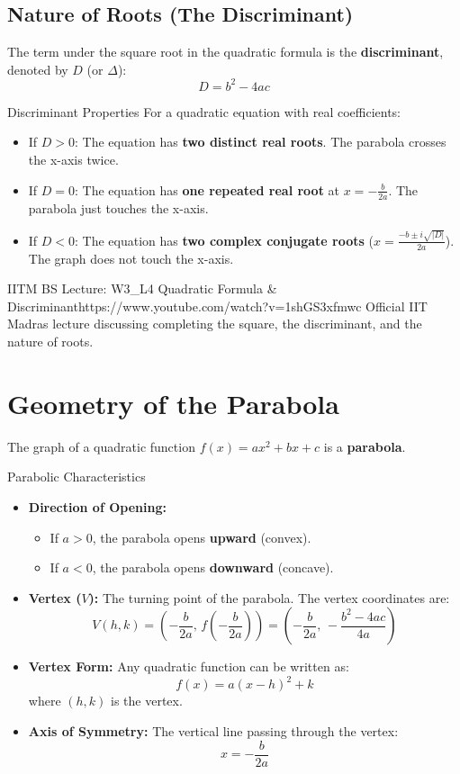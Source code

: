 \subsection{Nature of Roots (The Discriminant)}

The term under the square root in the quadratic formula is the \textbf{discriminant}, denoted by $D$ (or $\Delta$):
$$D = b^2 - 4ac$$

\begin{theorembox}{Discriminant Properties}
For a quadratic equation with real coefficients:
\begin{itemize}
    \item If $D > 0$: The equation has \textbf{two distinct real roots}. The parabola crosses the x-axis twice.
    \item If $D = 0$: The equation has \textbf{one repeated real root} at $x = -\frac{b}{2a}$. The parabola just touches the x-axis.
    \item If $D < 0$: The equation has \textbf{two complex conjugate roots} ($x = \frac{-b \pm i\sqrt{|D|}}{2a}$). The graph does not touch the x-axis.
\end{itemize}
\end{theorembox}

\begin{videocard}{IITM BS Lecture: W3\_L4 Quadratic Formula \& Discriminant}{https://www.youtube.com/watch?v=1shGS3xfmwc}
Official IIT Madras lecture discussing completing the square, the discriminant, and the nature of roots.
\end{videocard}

\section{Geometry of the Parabola}

The graph of a quadratic function $f(x) = ax^2 + bx + c$ is a \textbf{parabola}.

\begin{definitionbox}{Parabolic Characteristics}
\begin{itemize}
    \item \textbf{Direction of Opening:} 
        \begin{itemize}
            \item If $a > 0$, the parabola opens \textbf{upward} (convex).
            \item If $a < 0$, the parabola opens \textbf{downward} (concave).
        \end{itemize}
    \item \textbf{Vertex ($V$):} The turning point of the parabola. The vertex coordinates are:
    $$V(h, k) = \left( -\frac{b}{2a}, \, f\left(-\frac{b}{2a}\right) \right) = \left( -\frac{b}{2a}, \, -\frac{b^2 - 4ac}{4a} \right)$$
    \item \textbf{Vertex Form:} Any quadratic function can be written as:
    $$f(x) = a(x - h)^2 + k$$
    where $(h, k)$ is the vertex.
    \item \textbf{Axis of Symmetry:} The vertical line passing through the vertex:
    $$x = -\frac{b}{2a}$$
\end{itemize}
\end{definitionbox}


